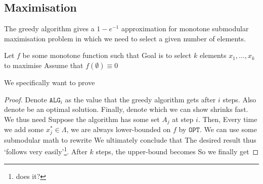\subsection{Maximisation}
\begin{theorem}
    The greedy algorithm gives a $1 - e^{-1}$ approximation for monotone submodular maximisation problem in which we need to select a given number of elements.
\end{theorem}
\begin{aside}
    Let $f$ be some monotone function such that
    Goal is to select $k$ elements $x_1, \ldots, x_k$ to maximise
    Assume that $f(\emptyset) \equiv 0$
\end{aside}
\begin{proposition}
    We specifically want to prove
\end{proposition}
\begin{proof}
    Denote $\texttt{ALG}_i$ as the value that the greedy algorithm gets after $i$ steps. Also denote
    be an optimal solution. Finally, denote
    which we can show shrinks fast. We thus need
    Suppose the algorithm has some set $A_j$ at step $i$. Then,
    Every time we add some $x_j^* \in \Lambda$, we are always lower-bounded on $f$ by $\texttt{OPT}$.
    We can use some submodular math to rewrite
    We ultimately conclude that
    The desired result thus `follows very easily'\footnote{does it?}.
    After $k$ steps, the upper-bound becomes
    So we finally get
\end{proof}


